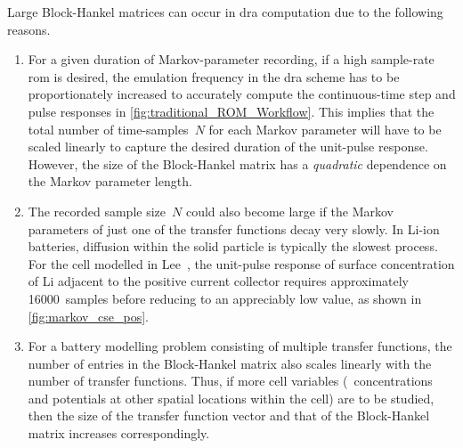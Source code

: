 Large Block-Hankel matrices can occur in \gls{dra} computation due to the
following reasons.
\begin{enumerate}
    \item
        For  a  given   duration  of  Markov-parameter  recording,   if  a  high
        sample-rate   \gls{rom}  is   desired,   the   emulation  frequency   in
        the   \gls{dra}  scheme   has   to  be   proportionately  increased   to
        accurately  compute  the continuous-time  step  and  pulse responses  in
        \cref{fig:traditional_ROM_Workflow}. This implies  that the total number
        of time-samples~$N$  for each  Markov parameter will  have to  be scaled
        linearly to  capture the  desired duration  of the  unit-pulse response.
        However,  the size  of the  Block-Hankel matrix  has a  \emph{quadratic}
        dependence on the Markov parameter length.
    \item
        The  recorded sample  size~$N$ could  also  become large  if the  Markov
        parameters of just  one of the transfer functions decay  very slowly. In
        Li-ion batteries, diffusion  within the solid particle  is typically the
        slowest process.  For the cell  modelled in Lee~\etal{},  the unit-pulse
        response of surface concentration of Li adjacent to the positive current
        collector  requires approximately  16000~samples before  reducing to  an
        appreciably low value, as shown in \cref{fig:markov_cse_pos}.
    \item
        For  a  battery  modelling   problem  consisting  of  multiple  transfer
        functions,  the  number  of  entries in  the  Block-Hankel  matrix  also
        scales linearly  with the  number of transfer  functions. Thus,  if more
        cell  variables (\eg~concentrations and  potentials at  other spatial
        locations  within the  cell) are  to be  studied, then  the size  of the
        transfer function vector  and that of the  Block-Hankel matrix increases
        correspondingly.
\end{enumerate}


